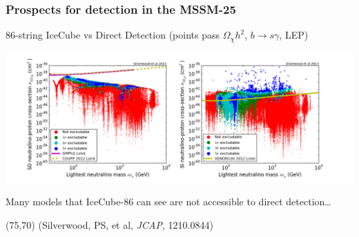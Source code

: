 \documentclass[xcolor=dvipsnames]{beamer}
\begin{document}
\begin{frame}
\begin{columns}[c]
\end{columns}

\end{frame}


\begin{frame}
\frametitle{Prospects for detection in the MSSM-25}
86-string IceCube vs Direct Detection {\scriptsize(points pass $\Omega_\chi h^2$, $b\rightarrow s\gamma$, LEP)}
\vspace{3mm}

\includegraphics[width=1.1\textwidth, trim = 50 0 0 0, clip=true]{MSSM25_DD}

\vspace{3mm}
Many models that IceCube-86 can see are not accessible to direct detection\ldots

\begin{textblock}{80}(75,70)
  {\tiny(Silverwood, PS, et al, \textit{JCAP}, 1210.0844)}
\end{textblock}

\end{frame}
\end{document}
